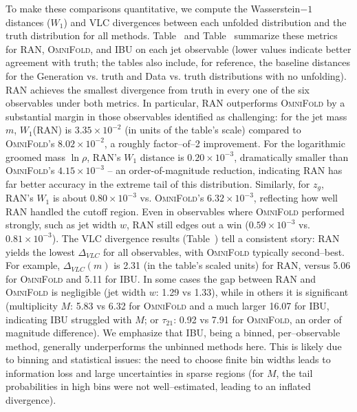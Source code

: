 {{            To make these comparisons quantitative, we compute the Wasserstein\(-1\) distances ($W_1$) and VLC divergences between each unfolded distribution and the truth distribution for all methods.
            Table~ and Table~ summarize these metrics for RAN, \textsc{OmniFold}, and IBU on each jet observable (lower values indicate better agreement with truth; the tables also include, for reference, the baseline distances for the Generation vs. truth and Data vs. truth distributions with no unfolding).
            RAN achieves the smallest divergence from truth in every one of the six observables under both metrics.
            In particular, RAN outperforms \textsc{OmniFold} by a substantial margin in those observables identified as challenging: for the jet mass $m$, $W_1$(RAN) is $3.35\times10^{-2}$ (in units of the table’s scale) compared to \textsc{OmniFold}’s $8.02\times10^{-2}$, a roughly factor--of--2 improvement.
            For the logarithmic groomed mass $\ln\rho$, RAN’s $W_1$ distance is $0.20\times10^{-3}$, dramatically smaller than \textsc{OmniFold}’s $4.15\times10^{-3}$ – an order-of-magnitude reduction, indicating RAN has far better accuracy in the extreme tail of this distribution.
            Similarly, for $z_g$, RAN’s $W_1$ is about $0.80\times10^{-3}$ vs. \textsc{OmniFold}’s $6.32\times10^{-3}$, reflecting how well RAN handled the cutoff region.
            Even in observables where \textsc{OmniFold} performed strongly, such as jet width $w$, RAN still edges out a win ($0.59\times10^{-3}$ vs. $0.81\times10^{-3}$).
            The VLC divergence results (Table~) tell a consistent story: RAN yields the lowest $\Delta_{VLC}$ for all observables, with \textsc{OmniFold} typically second--best.
            For example, $\Delta_{VLC}(m)$ is 2.31 (in the table’s scaled units) for RAN, versus 5.06 for \textsc{OmniFold} and 5.11 for IBU.
            In some cases the gap between RAN and \textsc{OmniFold} is negligible (jet width $w$: 1.29 vs 1.33), while in others it is significant (multiplicity $M$: 5.83 vs 6.32 for \textsc{OmniFold} and a much larger 16.07 for IBU, indicating IBU struggled with $M$; or $\tau_{21}$: 0.92 vs 7.91 for \textsc{OmniFold}, an order of magnitude difference).
            We emphasize that IBU, being a binned, per--observable method, generally underperforms the unbinned methods here.
            This is likely due to binning and statistical issues: the need to choose finite bin widths leads to information loss and large uncertainties in sparse regions (for $M$, the tail probabilities in high bins were not well--estimated, leading to an inflated divergence).
}}
